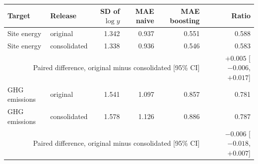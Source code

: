 \begin{tabular}{llrrrr}
\toprule
Target & Release & SD of $\log y$ & MAE naive & MAE boosting & Ratio \\
\midrule
Site energy & original & 1.342 & 0.937 & 0.551 & 0.588 \\
Site energy & consolidated & 1.338 & 0.936 & 0.546 & 0.583 \\
\multicolumn{5}{r}{Paired difference, original minus consolidated [95\% CI]} & $+0.005$ [$-0.006$, $+0.017$] \\
\midrule
GHG emissions & original & 1.541 & 1.097 & 0.857 & 0.781 \\
GHG emissions & consolidated & 1.578 & 1.126 & 0.886 & 0.787 \\
\multicolumn{5}{r}{Paired difference, original minus consolidated [95\% CI]} & $-0.006$ [$-0.018$, $+0.007$] \\
\bottomrule
\end{tabular}
